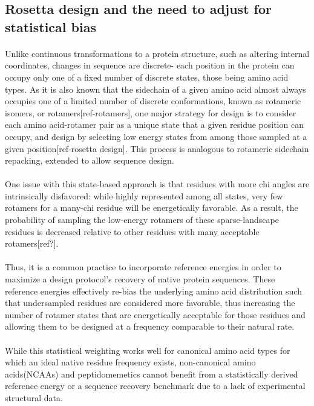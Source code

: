 \subsection{Rosetta design and the need to adjust for statistical bias}
\paragraph{}
Unlike continuous transformations to a protein structure, such as altering internal coordinates, changes in sequence are discrete- each position in the protein can occupy only one of a fixed number of discrete states, those being amino acid types. As it is also known that the sidechain of a given amino acid almost always occupies one of a limited number of discrete conformations, known as rotameric isomers, or rotamers[ref-rotamers], one major strategy for design is to consider each amino acid-rotamer pair as a unique state that a given residue position can occupy, and design by selecting low energy states from among those sampled at a given position[ref-rosetta design]. This process is analogous to rotameric sidechain repacking, extended to allow sequence design.

\paragraph{}
One issue with this state-based approach is that residues with more chi angles are intrinsically disfavored: while highly represented among all states, very few rotamers for a many-chi residue will be energetically favorable. As a result, the probability of sampling the low-energy rotamers of these sparse-landscape residues is decreased relative to other residues with many acceptable rotamers[ref?].

\paragraph{}
Thus, it is a common practice to incorporate reference energies in order to maximize a design protocol's recovery of native protein sequences. These reference energies effectively re-bias the underlying amino acid distribution such that undersampled residues are considered more favorable, thus increasing the number of rotamer states that are energetically acceptable for those residues and allowing them to be designed at a frequency comparable to their natural rate. 

\paragraph{}
While this statistical weighting works well for canonical amino acid types for which an ideal native residue frequency exists, non-canonical amino acids(NCAAs) and peptidomemetics cannot benefit from a statistically derived reference energy or a sequence recovery benchmark due to a lack of experimental structural data.

